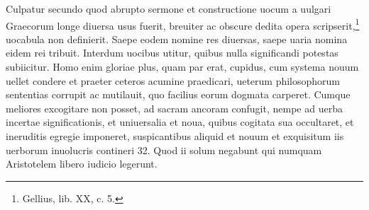 \documentclass{article}
\begin{document}
\begin{paracol}{3}
\begin{nthcolumn}{2}
  \end{nthcolumn}
  \vspace{0.5cm}
  \begin{nthcolumn*}{0} %
    Culpatur secundo quod abrupto sermone et constructione uocum a uulgari Graecorum longe diuersa usus fuerit, breuiter ac obscure dedita opera scripserit,\footnote[31]{Gellius, lib. XX, c. 5.} uocabula non definierit. Saepe eodem nomine res diuersas, saepe uaria nomina eidem rei tribuit. Interdum uocibus utitur, quibus nulla significandi potestas subiicitur. Homo enim gloriae plus, quam par erat, cupidus, cum systema nouum uellet condere et praeter ceteros acumine praedicari, ueterum philosophorum sententias corrupit ac mutilauit, quo facilius eorum dogmata carperet. Cumque meliores excogitare non posset, ad sacram ancoram confugit, nempe ad uerba incertae significationis, et uniuersalia et noua, quibus cogitata sua occultaret, et ineruditis egregie imponeret, suspicantibus aliquid et nouum et exquisitum iis uerborum inuolucris contineri 32. Quod ii solum negabunt qui numquam Aristotelem libero iudicio legerunt.
  \end{nthcolumn*}
  \vspace{0.5cm}
  \begin{nthcolumn}{1} %
    
  \end{nthcolumn}
  \vspace{0.5cm}
  \begin{nthcolumn}{2} %
    
  \end{nthcolumn}
\end{paracol}
\end{document}
